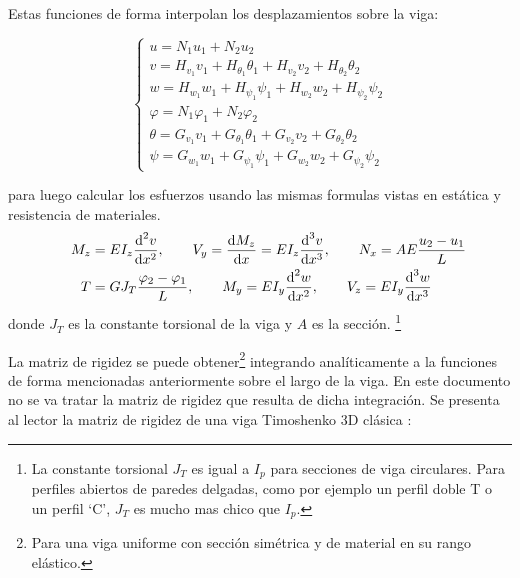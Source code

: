 Estas funciones de forma interpolan los desplazamientos sobre la viga:

\begin{equation} \label{eq:interpolacionFuncForma1D}
	\begin{cases}
	u=N_{1} u_{1}+N_{2} u_{2} \\
	v=H_{v_{1}} v_{1}+H_{\theta_{1}} \theta_{1}+H_{v_{2}} v_{2}+H_{\theta_{2}} \theta_{2} \\
	w=H_{w_{1}} w_{1}+H_{\psi_{1}} \psi_{1}+H_{w_{2}} w_{2}+H_{\psi_{2}} \psi_{2} \\
	\varphi=N_{1} \varphi_{1}+N_{2} \varphi_{2} \\
	\theta=G_{v_{1}} v_{1}+G_{\theta_{1}} \theta_{1}+G_{v_{2}} v_{2}+G_{\theta_{2}} \theta_{2} \\
	\psi=G_{w_{1}} w_{1}+G_{\psi_{1}} \psi_{1}+G_{w_{2}} w_{2}+G_{\psi_{2}} \psi_{2}
	\end{cases}
\end{equation} 



para luego calcular los esfuerzos usando las mismas formulas vistas en estática y resistencia de materiales.
\begin{align*}
	M_{z}&=E I_{z} \frac{\textrm{d}^{2} v}{\textrm{d} x^{2}}, \qquad V_{y}=\frac{\textrm{d} M_{z}}{\textrm{d} x}=E I_{z} \frac{\textrm{d}^{3} v}{\textrm{d} x^{3}}, \qquad N_x=A E \frac{u_{2}-u_{1}}{L} \\
	\qquad T&=G J_T \frac{\varphi_{2}-\varphi_{1}}{L}, \qquad M_{y}=E I_{y} \frac{\textrm{d}^{2} w}{\textrm{d} x^{2}}, \qquad V_{z}=E I_{y} \frac{\textrm{d}^{3} w}{\textrm{d} x^{3}}
\end{align*}
donde $J_T$ es la constante torsional de la viga y $A$ es la sección. \footnote{La constante torsional $J_T$ es igual a $I_p$ para secciones de viga circulares. Para perfiles abiertos de paredes delgadas, como por ejemplo un perfil doble T o un perfil `C', $J_T$ es mucho mas chico que $I_p$.}

La matriz de rigidez se puede obtener\footnote{Para una viga uniforme con sección simétrica y de  material en su rango elástico.} integrando analíticamente a la funciones de forma mencionadas anteriormente sobre el largo de la viga. En este documento no se va tratar la matriz de rigidez que resulta de dicha integración. Se presenta al lector la matriz de rigidez de una viga Timoshenko 3D clásica \cite{cook2007concepts}:

